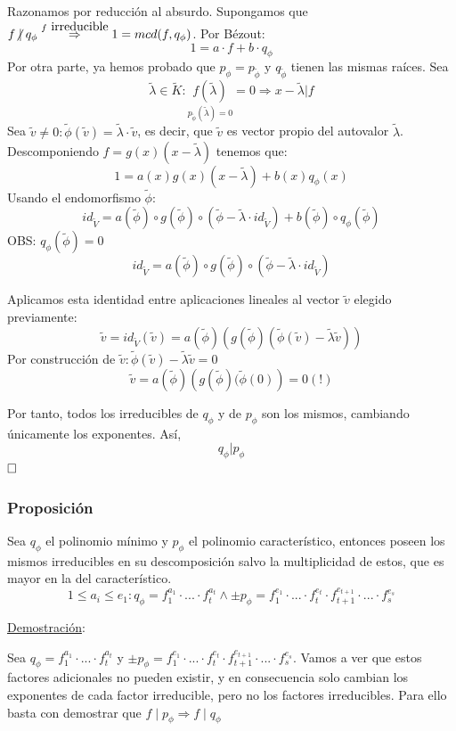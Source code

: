\documentclass[10pt,a4paper,openright]{book}
\begin{document}
Razonamos por reducción al absurdo. Supongamos que $f \centernot \mid q_\phi \overset{f \mbox{ irreducible}}{\Rightarrow} 1 = mcd(f, q_\phi)$. Por Bézout:
$$1 = a\cdot f + b \cdot q_\phi$$
Por otra parte, ya hemos probado que $p_\phi = p_{\tilde{\phi}} \mbox{ y } q_{\tilde{\phi}}$ tienen las mismas raíces. Sea $$\tilde{\lambda} \in \tilde{K} : \underset{ p_{\tilde{\phi}} (\tilde{\lambda}) = 0}{f(\tilde{\lambda})} = 0 \Rightarrow x - \tilde{\lambda} | f$$
Sea $\tilde{v} \neq 0 : \tilde{\phi} (\tilde{v}) = \tilde{\lambda} \cdot \tilde{v}$, es decir, que $\tilde{v}$ es vector propio del autovalor $\tilde{\lambda}$. Descomponiendo $f = g(x)(x-\tilde{\lambda})$ tenemos que:
$$1 = a(x)g(x)(x-\tilde{\lambda}) + b(x)q_\phi (x) $$
Usando el endomorfismo $\tilde{\phi}$:
$$id_{\tilde{V}} = a(\tilde{\phi})\circ g(\tilde{\phi}) \circ(\tilde{\phi} - \tilde{\lambda} \cdot id_{\tilde{V}}) + b(\tilde{\phi}) \circ q_\phi (\tilde{\phi})$$
OBS: $q_\phi (\tilde{\phi}) = 0$
$$id_{\tilde{V}} = a(\tilde{\phi})\circ g(\tilde{\phi}) \circ(\tilde{\phi} - \tilde{\lambda} \cdot id_{\tilde{V}})$$

Aplicamos esta identidad entre aplicaciones lineales al vector $\tilde{v}$ elegido previamente:
$$\tilde{v} = id_{\tilde{V}} (\tilde{v})= a(\tilde{\phi})\left( g(\tilde{\phi})( \tilde{\phi}(\tilde{v}) - \tilde{\lambda}\tilde{v})\right)$$
Por construcción de $\tilde{v} : \tilde{\phi}(\tilde{v}) - \tilde{\lambda}\tilde{v} = 0$
$$\tilde{v} = a(\tilde{\phi})\left( g(\tilde{\phi})( \tilde{\phi}(0)\right) = 0 (!)$$

Por tanto, todos los irreducibles de $q_\phi$ y de $p_\phi$ son los mismos, cambiando únicamente los exponentes. Así, $$q_\phi | p_\phi$$
$\hfill\square$

\subsubsection*{Proposición}
Sea $q_\phi$ el polinomio mínimo y $p_\phi$ el polinomio característico, entonces poseen los mismos irreducibles en su descomposición salvo la multiplicidad de estos, que es mayor en la del característico.
$$1\leq a_i\leq e_1: q_\phi = f_1^{a_1} \cdot ... \cdot f_t^{a_t} \wedge \pm p_\phi=f_1^{e_1} \cdot ... \cdot f_t^{e_t}\cdot f_{t+1}^{e_{t+1}} \cdot ... \cdot f_{s}^{e_s}$$

\underline{Demostración}:

Sea $q_\phi = f_1^{a_1} \cdot ... \cdot f_t^{a_t}$ y $\pm p_\phi=f_1^{e_1} \cdot ... \cdot f_t^{e_t}\cdot f_{t+1}^{e_{t+1}} \cdot ... \cdot f_{s}^{e_s}$. Vamos a ver que estos factores adicionales no pueden existir, y en consecuencia solo cambian los exponentes de cada factor irreducible, pero no los factores irreducibles. Para ello basta con demostrar que $f\mid p_\phi\Rightarrow f\mid q_\phi$
\end{document}

